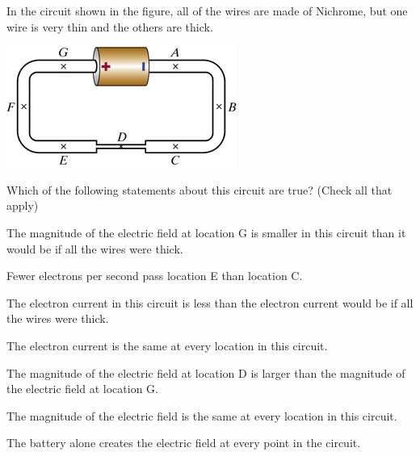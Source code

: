 \question[10] In the circuit shown in the figure, all of the wires are made of Nichrome, but one wire is very thin and the others are thick.

\begin{center}
	\includegraphics[width=.6\textwidth]{ch18q1.jpg}
\end{center}

Which of the following statements about this circuit are true? (Check all that apply)
\begin{todolist}
	\item The magnitude of the electric field at location G is smaller in this circuit than it would be if all the wires were thick.
	\item Fewer electrons per second pass location E than location C.
	\item The electron current in this circuit is less than the electron current would be if all the wires were thick.
	\item The electron current is the same at every location in this circuit.
	\item The magnitude of the electric field at location D is larger than the magnitude of the electric field at location G.
	\item The magnitude of the electric field is the same at every location in this circuit.
	\item The battery alone creates the electric field at every point in the circuit.
\end{todolist}